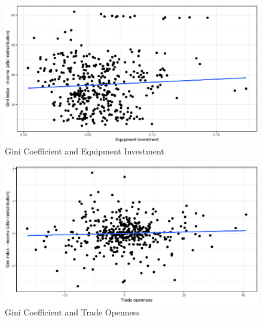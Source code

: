 \documentclass[a4paper,11pt]{article}
\begin{document}
\begin{figure}
    \caption{Gini Coefficient and Equipment Investment}
    \label{fig:giniequipi}
\includegraphics[width=\textwidth, keepaspectratio]{figures/EquipIGiniNet}
\end{figure}

\begin{figure}
    \caption{Gini Coefficient and Trade Openness}
    \label{fig:ginitrade}
\includegraphics[width=\textwidth, keepaspectratio]{figures/TradeOpenGiniNet}
\end{figure}
\end{document}
